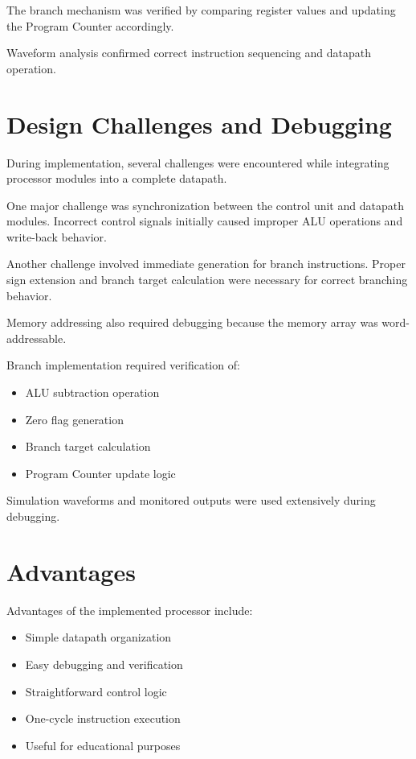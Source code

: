 \documentclass[conference]{IEEEtran}
\begin{document}
The branch mechanism was verified by comparing register values and updating the Program Counter accordingly.

Waveform analysis confirmed correct instruction sequencing and datapath operation.


\section{Design Challenges and Debugging}

During implementation, several challenges were encountered while integrating processor modules into a complete datapath.

One major challenge was synchronization between the control unit and datapath modules. Incorrect control signals initially caused improper ALU operations and write-back behavior.

Another challenge involved immediate generation for branch instructions. Proper sign extension and branch target calculation were necessary for correct branching behavior.

Memory addressing also required debugging because the memory array was word-addressable.

Branch implementation required verification of:

\begin{itemize}
    \item ALU subtraction operation
    \item Zero flag generation
    \item Branch target calculation
    \item Program Counter update logic
\end{itemize}

Simulation waveforms and monitored outputs were used extensively during debugging.


\section{Advantages}

Advantages of the implemented processor include:

\begin{itemize}
    \item Simple datapath organization
    \item Easy debugging and verification
    \item Straightforward control logic
    \item One-cycle instruction execution
    \item Useful for educational purposes
\end{itemize}
\end{document}
